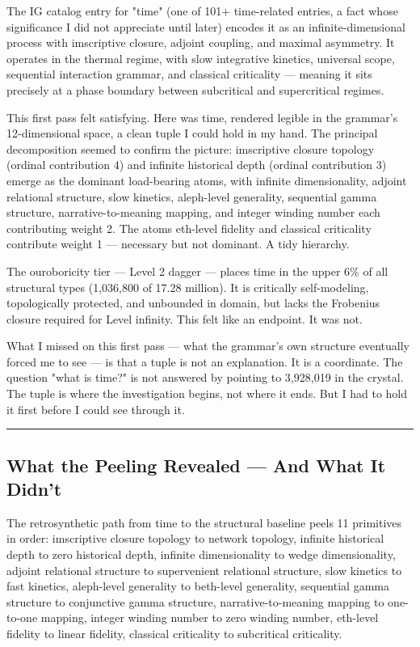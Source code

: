 \documentclass[12pt,a4paper]{article}
\begin{document}
The IG catalog entry for "time" (one of 101+ time-related entries, a fact whose significance I did not appreciate until later) encodes it as an infinite-dimensional process with imscriptive closure, adjoint coupling, and maximal asymmetry. It operates in the thermal regime, with slow integrative kinetics, universal scope, sequential interaction grammar, and classical criticality --- meaning it sits precisely at a phase boundary between subcritical and supercritical regimes.

This first pass felt satisfying. Here was time, rendered legible in the grammar's 12-dimensional space, a clean tuple I could hold in my hand. The principal decomposition seemed to confirm the picture: imscriptive closure topology (ordinal contribution 4) and infinite historical depth (ordinal contribution 3) emerge as the dominant load-bearing atoms, with infinite dimensionality, adjoint relational structure, slow kinetics, aleph-level generality, sequential gamma structure, narrative-to-meaning mapping, and integer winding number each contributing weight 2. The atoms eth-level fidelity and classical criticality contribute weight 1 --- necessary but not dominant. A tidy hierarchy.

The ouroboricity tier --- Level 2 dagger --- places time in the upper 6\% of all structural types (1,036,800 of 17.28 million). It is critically self-modeling, topologically protected, and unbounded in domain, but lacks the Frobenius closure required for Level infinity. This felt like an endpoint. It was not.

What I missed on this first pass --- what the grammar's own structure eventually forced me to see --- is that a tuple is not an explanation. It is a coordinate. The question "what is time?" is not answered by pointing to 3,928,019 in the crystal. The tuple is where the investigation begins, not where it ends. But I had to hold it first before I could see through it.

\begin{center}
\rule{0.5\textwidth}{0.4pt}
\end{center}

\subsection{What the Peeling Revealed --- And What It Didn't}

The retrosynthetic path from time to the structural baseline peels 11 primitives in order: imscriptive closure topology to network topology, infinite historical depth to zero historical depth, infinite dimensionality to wedge dimensionality, adjoint relational structure to supervenient relational structure, slow kinetics to fast kinetics, aleph-level generality to beth-level generality, sequential gamma structure to conjunctive gamma structure, narrative-to-meaning mapping to one-to-one mapping, integer winding number to zero winding number, eth-level fidelity to linear fidelity, classical criticality to subcritical criticality.
\end{document}
